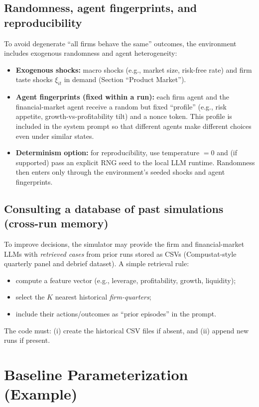 \documentclass[11pt]{article}
\begin{document}
\subsection{Randomness, agent fingerprints, and reproducibility}
To avoid degenerate ``all firms behave the same'' outcomes, the environment includes exogenous randomness and agent heterogeneity:
\begin{itemize}[leftmargin=*]
    \item \textbf{Exogenous shocks:} macro shocks (e.g., market size, risk-free rate) and firm taste shocks $\xi_{it}$ in demand (Section ``Product Market'').
    \item \textbf{Agent fingerprints (fixed within a run):} each firm agent and the financial-market agent receive a random but fixed ``profile'' (e.g., risk appetite, growth-vs-profitability tilt) and a nonce token. This profile is included in the system prompt so that different agents make different choices even under similar states.
    \item \textbf{Determinism option:} for reproducibility, use temperature $=0$ and (if supported) pass an explicit RNG seed to the local LLM runtime. Randomness then enters only through the environment's seeded shocks and agent fingerprints.
\end{itemize}

\subsection{Consulting a database of past simulations (cross-run memory)}
To improve decisions, the simulator may provide the firm and financial-market LLMs with \emph{retrieved cases} from prior runs stored as CSVs (Compustat-style quarterly panel and debrief dataset). A simple retrieval rule:
\begin{itemize}[leftmargin=*]
    \item compute a feature vector (e.g., leverage, profitability, growth, liquidity);
    \item select the $K$ nearest historical \emph{firm-quarters};
    \item include their actions/outcomes as ``prior episodes'' in the prompt.
\end{itemize}
The code must: (i) create the historical CSV files if absent, and (ii) append new runs if present.

\section{Baseline Parameterization (Example)}
\end{document}
